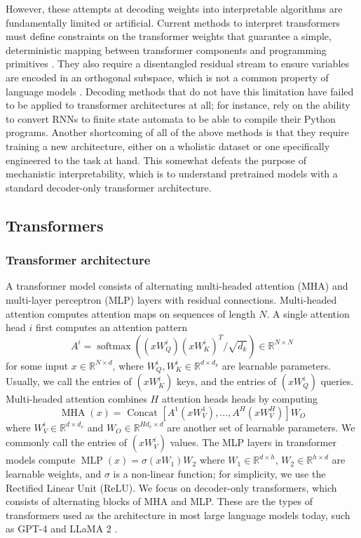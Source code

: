 \documentclass[11pt]{scrartcl}
\begin{document}
However, these attempts at decoding weights into interpretable algorithms are fundamentally limited or artificial. Current methods to interpret transformers must define constraints on the transformer weights that guarantee a simple, deterministic mapping between transformer components and programming primitives \cite{friedman2024learning}. They also require a disentangled residual stream to ensure variables are encoded in an orthogonal subspace, which is not a common property of language models \cite{elhage2022toy}. Decoding methods that do not have this limitation have failed to be applied to transformer architectures at all; for instance, \textcite{michaud2024opening} rely on the ability to convert RNNs to finite state automata to be able to compile their Python programs. Another shortcoming of all of the above methods is that they require training a new architecture, either on a wholistic dataset or one specifically engineered to the task at hand. This somewhat defeats the purpose of mechanistic interpretability, which is to understand pretrained models with a standard decoder-only transformer architecture. 

\subsection{Transformers}

\subsubsection{Transformer architecture}

A transformer model consists of alternating multi-headed attention (MHA) and multi-layer perceptron (MLP) layers with residual connections. Multi-headed attention \cite{vaswani2017attention} computes attention maps on sequences of length $N$. A single attention head $i$ first computes an attention pattern
$$
A^i=\operatorname{softmax}\left(\left(x W_Q^i\right)\left(x W_K^i\right)^T / \sqrt{d_k}\right) \in \mathbb{R}^{N \times N}
$$
for some input $x \in \mathbb{R}^{N \times d}$, where $W_Q^i, W_K^i \in \mathbb{R}^{d \times d_k}$ are learnable parameters. Usually, we call the entries of $\left(x W_K^i\right)$ keys, and the entries of $\left(x W_Q^i\right)$ queries. Multi-headed attention combines $H$ attention heads heads by computing
$$
\operatorname{MHA}(x)=\text { Concat }\left[A^1\left(x W_V^1\right), \ldots, A^H\left(x W_V^H\right)\right] W_O
$$
where $W_V^i \in \mathbb{R}^{d \times d_v}$ and $W_O \in \mathbb{R}^{H d_v \times d}$ are another set of learnable parameters. We commonly call the entries of $\left(x W_V^i\right)$ values.
The MLP layers in transformer models compute $\operatorname{MLP}(x)=\sigma\left(x W_1\right) W_2$ where $W_1 \in \mathbb{R}^{d \times h}$, $W_2 \in \mathbb{R}^{h \times d}$ are learnable weights, and $\sigma$ is a non-linear function; for simplicity, we use the Rectified Linear Unit (ReLU). We focus on decoder-only transformers, which consists of alternating blocks of MHA and MLP. These are the types of transformers used as the architecture in most large language models today, such as GPT-4 \cite{achiam2023gpt} and LLaMA 2 \cite{touvron2023llama}. 
\end{document}
